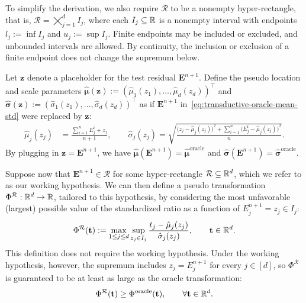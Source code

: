 To simplify the derivation, we also require $\mathcal R$ to be a nonempty hyper-rectangle, that is, $\mathcal R=\bigtimes_{j=1}^d I_j$, where each $I_j\subseteq\mathbb{R}$ is a nonempty interval with endpoints $l_j:=\inf I_j$ and $u_j:=\sup I_j$. Finite endpoints may be included or excluded, and unbounded intervals are allowed. By continuity, the inclusion or exclusion of a finite endpoint does not change the supremum below.

Let $\mathbf z$ denote a placeholder for the test residual $\mathbf E^{n+1}$.
Define the pseudo location and scale parameters
$\hat{\boldsymbol\mu}(\mathbf z):=(\hat\mu_1(z_1),\ldots,\hat\mu_d(z_d))^\top$
and
$\hat{\boldsymbol\sigma}(\mathbf z):=(\hat\sigma_1(z_1),\ldots,\hat\sigma_d(z_d))^\top$
as if $\mathbf E^{n+1}$ in~\eqref{eq:transductive-oracle-mean-std} were replaced by $\mathbf z$:
\begin{align}\label{eq:placeholder-mean-std}
\hat\mu_j(z_j)
&=
\frac{\sum_{i=1}^nE_j^i+z_j}{n+1},
\qquad
\hat\sigma_j(z_j)
=
\sqrt{
\frac{
\bigl(z_j-\hat\mu_j(z_j)\bigr)^2
+
\sum_{i=1}^n\!\bigl(E_j^i-\hat\mu_j(z_j)\bigr)^2
}{n}
}.
\end{align}
By plugging in $\mathbf z=\mathbf E^{n+1}$, we have
$\hat{\boldsymbol\mu}(\mathbf E^{n+1})=\hat{\boldsymbol\mu}^{\mathrm{oracle}}$
and
$\hat{\boldsymbol\sigma}(\mathbf E^{n+1})=\hat{\boldsymbol\sigma}^{\mathrm{oracle}}$.

Suppose now that $\mathbf E^{n+1}\in\mathcal R$ for some hyper-rectangle $\mathcal R\subseteq\mathbb{R}^d$, which we refer to as our working hypothesis. We can then define a pseudo transformation $\Phi^{\mathcal R}:\mathbb{R}^d\to\mathbb{R}$, tailored to this hypothesis, by considering the most unfavorable (largest) possible value of the standardized ratio as a function of $E_j^{n+1}=z_j\in I_j$:
\begin{equation}\label{eq:pseudo-transformation}
\Phi^{\mathcal R}(\mathbf t)
:=
\max_{1\leq j\leq d}
\sup_{z_j\in I_j}
\frac{t_j-\hat\mu_j(z_j)}{\hat\sigma_j(z_j)},
\qquad
\mathbf t\in\mathbb{R}^d.
\end{equation}
This definition does not require the working hypothesis. Under the working hypothesis, however, the supremum includes $z_j=E_j^{n+1}$ for every $j\in[d]$, so $\Phi^{\mathcal R}$ is guaranteed to be at least as large as the oracle transformation:
\[
\Phi^{\mathcal R}(\mathbf t)
\geq
\Phi^{\mathrm{oracle}}(\mathbf t),
\qquad
\forall\mathbf t\in\mathbb{R}^d.
\]

